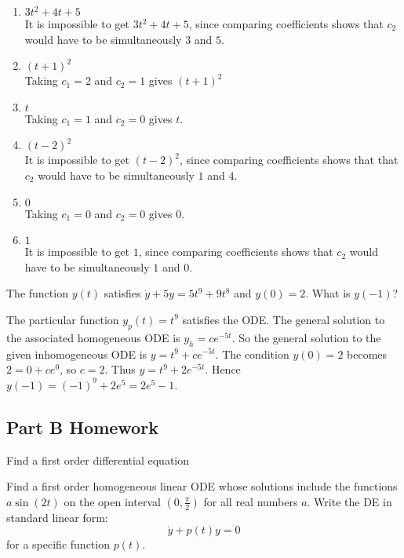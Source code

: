 \begin{enumerate}
\item $3t^2+4t+5$ \\
  It is impossible to get $3t^2+4t+5$, since comparing coefficients shows that
  $c_2$ would have to be simultaneously $3$ and $5$.
\item $(t+1)^2$ \\
  Taking $c_1 = 2$ and $c_2 = 1$ gives $(t+1)^2$ 
\item $t$ \\
  Taking $c_1 = 1$ and $c_2 = 0$ gives $t$.
\item $(t-2)^2 $ \\
  It is impossible to get $(t-2)^2 $, since comparing coefficients shows that
  that $c_2$ would have to be simultaneously $1$ and $4$.
\item $0$ \\
  Taking $c_1 = 0$ and $c_2 = 0$ gives $0$.
\item $1$ \\
  It is impossible to get $1$, since comparing coefficients shows that $c_2$ would have
  to be simultaneously $1$ and $0$.
\end{enumerate}

\begin{homework}
  The function $y(t)$ satisfies $\dot{y} + 5 y = 5 t^9 + 9 t^8$ and $y(0)=2$. What is $y(−1)$? 
\end{homework}

The particular function $y_ p(t) = t^9$ satisfies the ODE.
The general solution to the associated homogeneous ODE is $y_ h = c e^{-5t}$.
So the general solution to the given inhomogeneous ODE is $y = t^9 + c e^{-5t}$.
The condition $y(0) = 2$ becomes $2 = 0 + c e ^0$, so $c = 2$.
Thus $y = t^9 + 2 e ^{−5t}$. Hence $y(−1) = (−1) ^9 + 2 e ^5 = 2 e ^5 - 1$.
\clearpage

\subsection{Part B Homework}
\begin{homework}
  Find a first order differential equation
\end{homework}
Find a first order homogeneous linear ODE whose solutions include the functions
$a \sin⁡ (2t)$ on the open interval $( 0, \frac{\pi}{2})$ for all real numbers $a$.
Write the DE in standard linear form:
\begin{equation*}
  \dot{y} + p(t) y = 0
\end{equation*}
for a specific function $p(t)$.\\



\clearpage
